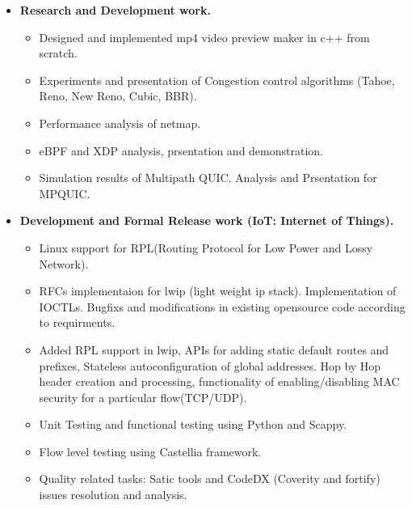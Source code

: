 \begin{itemize}
	\item \textbf{Research and Development work.}\\[-0.6cm]
	\begin{itemize}  	
		\item Designed and implemented mp4 video preview maker in c++ from scratch. \\[-0.5cm]
		\item Experiments and presentation of Congestion control algorithms (Tahoe, Reno, New Reno, Cubic, BBR).\\[-0.5cm]
		\item Performance analysis of netmap.\\[-0.5cm]
		\item eBPF and XDP analysis, prsentation and demonstration.\\[-0.5cm] 
		\item Simulation results of Multipath QUIC. Analysis and Prsentation for MPQUIC.\\[-0.5cm]
	\end{itemize}
	\item \textbf{Development and Formal Release work (IoT: Internet of Things).} \\[-0.6cm]
	\begin{itemize} 
	 \item Linux support for RPL(Routing Protocol for Low Power and Lossy Network).\\[-0.5cm]
	 \item RFCs implementaion for lwip (light weight ip stack). Implementation of IOCTLs. Bugfixs and modifications in existing opensource code according to requirments.\\[-0.5cm]
	 \item Added RPL support in lwip, APIs for adding static default routes and prefixes, Stateless autoconfiguration of global addresses. Hop by Hop header creation and processing, functionality of enabling/disabling MAC security for a particular flow(TCP/UDP).\\[-0.5cm]
	 \item Unit Testing and functional testing using Python and Scappy.\\[-0.5cm]
	 \item Flow level testing using Castellia framework.\\[-0.5cm]
	 \item Quality related tasks: Satic tools and CodeDX (Coverity and fortify) issues resolution and analysis.\\[-0.5cm]
	\end{itemize}
\end{itemize}
